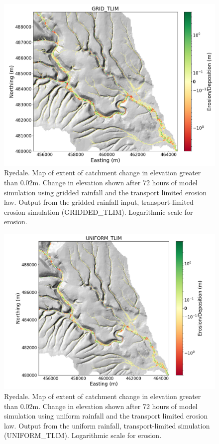\begin{figure}[htb]
\includegraphics[width=16cm]{chp06_figures_scripts/fig_ryedale_lower_erodediff_grid_tlim.png}
\caption{Ryedale. Map of extent of catchment change in elevation greater than 0.02m. Change in elevation shown after 72 hours of model simulation using gridded rainfall and the transport limited erosion law. Output from the gridded rainfall input, transport-limited erosion simulation (GRIDDED\_TLIM). Logarithmic scale for erosion.}
\label{fig_ryedale_erodediff_lower_grid_tlim}
\end{figure}

\begin{figure}[htb]
\includegraphics[width=16cm]{chp06_figures_scripts/fig_ryedale_lower_erodediff_uniform_tlim.png}
\caption{Ryedale. Map of extent of catchment change in elevation greater than 0.02m. Change in elevation shown after 72 hours of model simulation using uniform rainfall and the transport limited erosion law. Output from the uniform rainfall, transport-limited simulation (UNIFORM\_TLIM). Logarithmic scale for erosion.}
\label{fig_ryedale_erodediff_lower_uniform_tlim}
\end{figure}

